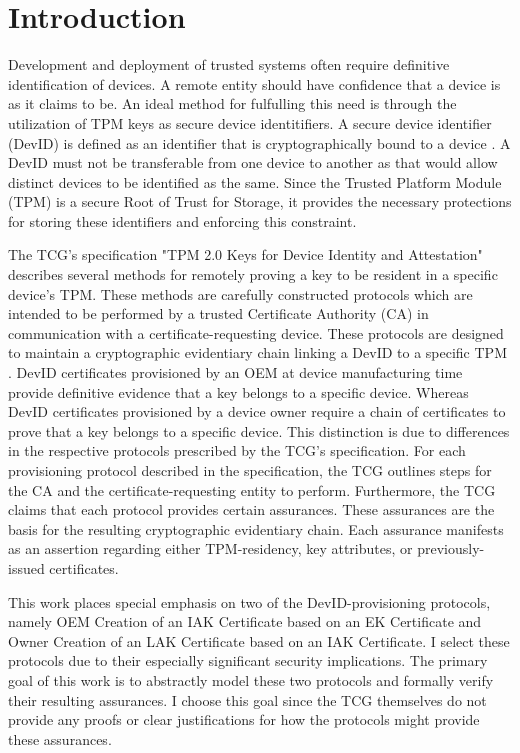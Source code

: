 \chapter{Introduction}




Development and deployment of trusted systems often require definitive identification of devices. A remote entity should have confidence that a device is as it claims to be. An ideal method for fulfulling this need is through the utilization of TPM keys as secure device identitifiers. A secure device identifier (DevID) is defined as an identifier that is cryptographically bound to a device \cite{DevIDSpec-IEEE}. 
A DevID must not be transferable from one device to another as that would allow distinct devices to be identified as the same. 
Since the Trusted Platform Module (TPM) is a secure Root of Trust for Storage, it provides the necessary protections for storing these identifiers and enforcing this constraint. 

The TCG's specification "TPM 2.0 Keys for Device Identity and Attestation" describes several methods for remotely proving a key to be resident in a specific device's TPM. These methods are carefully constructed protocols which are intended to be performed by a trusted Certificate Authority (CA) in communication with a certificate-requesting device. These protocols are designed to maintain a cryptographic evidentiary chain linking a DevID to a specific TPM \cite{DevIDSpec-TCG}. 
DevID certificates provisioned by an OEM at device manufacturing time provide definitive evidence that a key belongs to a specific device. Whereas DevID certificates provisioned by a device owner require a chain of certificates to prove that a key belongs to a specific device. This distinction is due to differences in the respective protocols prescribed by the TCG's specification. 
For each provisioning protocol described in the specification, the TCG outlines steps for the CA and the certificate-requesting entity to perform. Furthermore, the TCG claims that each protocol provides certain assurances. These assurances are the basis for the resulting cryptographic evidentiary chain.
Each assurance manifests as an assertion regarding either TPM-residency, key attributes, or previously-issued certificates.

This work places special emphasis on two of the DevID-provisioning protocols, namely OEM Creation of an IAK Certificate based on an EK Certificate and Owner Creation of an LAK Certificate based on an IAK Certificate. I select these protocols due to their especially significant security implications. The primary goal of this work is to abstractly model these two protocols and formally verify their resulting assurances. I choose this goal since the TCG themselves do not provide any proofs or clear justifications for how the protocols might provide these assurances. 




